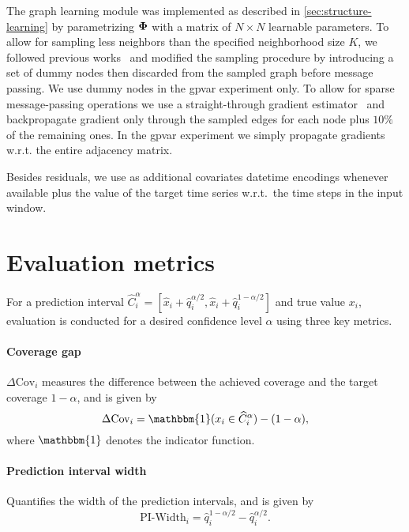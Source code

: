 The graph learning module was implemented as described in \autoref{sec:structure-learning} by parametrizing ${\bm{\Phi}}$ with a matrix of $N\times N$ learnable parameters. To allow for sampling less neighbors than the specified neighborhood size $K$, we followed previous works~\cite{cini2023sparse} and modified the sampling procedure by introducing a set of dummy nodes then discarded from the sampled graph before message passing. We use dummy nodes in the \gls{gpvar} experiment only. To allow for sparse message-passing operations we use a straight-through gradient estimator~\cite{bengio2013estimating} and backpropagate gradient only through the sampled edges for each node plus $10\%$ of the remaining ones. In the \gls{gpvar} experiment we simply propagate gradients w.r.t. the entire adjacency matrix. 

Besides residuals, we use as additional covariates datetime encodings whenever available plus the value of the target time series w.r.t.\ the time steps in the input window.


\section{Evaluation metrics}
For a prediction interval $\widehat{C}_i^\alpha = [\hat{x}_i + \hat{q}_i^{\alpha/2}, \hat{x}_i + \hat{q}_i^{1-\alpha/2}]$ and true value $x_i$, evaluation is conducted for a desired confidence level $\alpha$ using three key metrics. 

\paragraph{Coverage gap} $\Delta\text{Cov}_i$ measures the difference between the achieved coverage and the target coverage $1-\alpha$, and is given by
\begin{equation}
    \text{$\Delta$Cov}_i = \mathbbm{1}(x_i \in \widehat{C}_i^\alpha) - (1-\alpha),
\end{equation}
where $\mathbbm{1}$ denotes the indicator function.

\paragraph{Prediction interval width} Quantifies the width of the prediction intervals, and is given by
\begin{equation}
    \text{PI-Width}_i = \hat{q}_i^{1-\alpha/2} - \hat{q}_i^{\alpha/2}.
\end{equation}

